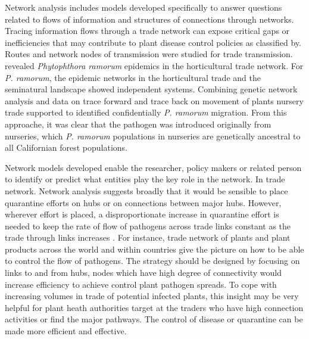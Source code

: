 Network analysis includes models developed specifically to answer questions related to flows of information and structures of connections through networks. Tracing information flows through a trade network can expose critical gaps or inefficiencies that may contribute to plant disease control policies as classified by. Routes and network nodes of transmission were studied for trade transmission.  revealed \textit{Phytophthora ramorum} epidemics in the horticultural trade network. For \textit{P. ramorum}, the epidemic networks in the horticultural trade and the seminatural landscape showed independent systems. Combining genetic network analysis and data on trace forward and trace back on movement of plants nursery trade supported to identified confidentially \textit{P. ramorum} migration. From this approache, it was clear that the pathogen was introduced originally from nurseries, which \textit{P. ramorum} populations in nurseries are genetically ancestral to all Californian forest populations.

Network models developed enable the researcher, policy makers or related person to identify or predict what entities play the key role in the network. In trade network. Network analysis suggests broadly that it would be sensible to place quarantine efforts on hubs or on connections between major hubs. However, wherever effort is placed, a disproportionate increase in quarantine effort is needed to keep the rate of flow of pathogens across trade links constant as the trade through links increases . For instance, trade network of plants and plant products across the world and within countries give the picture on how to be able to control the flow of pathogens. The strategy should be designed by focusing on links to and from hubs, nodes which have high degree of connectivity would increase efficiency to achieve control plant pathogen spreads. To cope with increasing volumes in trade of potential infected plants, this insight may be very helpful for plant heath authorities target at the traders who have high connection activities or find the major pathways. The control of disease or quarantine can be made more efficient and effective.

